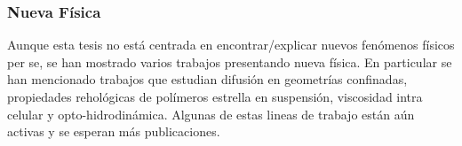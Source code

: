 \documentclass[twoside,openright,titlepage,numbers=noenddot,%
headinclude,footinclude,cleardoublepage=empty,abstract=on,
BCOR=5mm,fontsize=11pt, dvipsnames, paper=b5
]{scrreprt}
\begin{document}
\subsubsection*{Nueva Física}
Aunque esta tesis no está centrada en encontrar/explicar nuevos fenómenos físicos per se, se han mostrado varios trabajos presentando nueva física. En particular se han mencionado trabajos que estudian difusión en geometrías confinadas, propiedades rehológicas de polímeros estrella en suspensión, viscosidad intra celular y opto-hidrodinámica. Algunas de estas lineas de trabajo están aún activas y se esperan más publicaciones.




\end{document}
